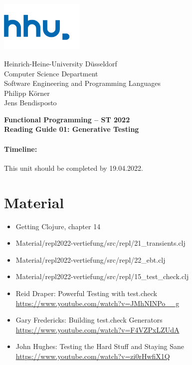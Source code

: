 \documentclass[11pt,a4paper]{article}
\begin{document}
\begin{minipage}[b]{\textwidth}
	\parbox[t]{5cm}{%
		\includegraphics[width=4cm]{unilogo}
		\hfill
	}
	\parbox[b]{11cm}{%
		Heinrich-Heine-University D\"usseldorf\\
		Computer Science Department\\
		Software Engineering and Programming Languages\\
		Philipp K\"orner \\
        Jens Bendisposto
	}
\end{minipage}
\begin{center}
	\bf
	Functional Programming -- ST 2022\\
	Reading Guide 01: Generative Testing
\end{center}

\pagestyle{empty}

\paragraph{Timeline:} This unit should be completed by 19.04.2022.

\section{Material} 

\begin{itemize}
    \item Getting Clojure, chapter 14
	\item Material/repl2022-vertiefung/src/repl/21\_transients.clj
	\item Material/repl2022-vertiefung/src/repl/22\_ebt.clj
	\item Material/repl2022-vertiefung/src/repl/15\_test\_check.clj
	\item Reid Draper: Powerful Testing with test.check \url{https://www.youtube.com/watch?v=JMhNINPo__g}
	\item Gary Fredericks: Building test.check Generators \url{https://www.youtube.com/watch?v=F4VZPxLZUdA}
	\item John Hughes: Testing the Hard Stuff and Staying Sane \url{https://www.youtube.com/watch?v=zi0rHwfiX1Q}
\end{itemize}
\end{document}
